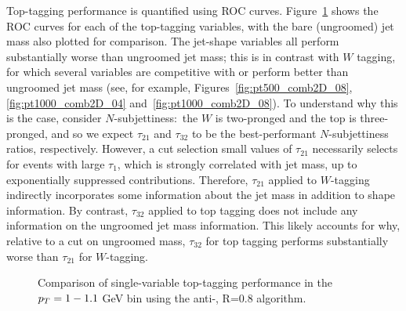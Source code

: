 Top-tagging performance is quantified using ROC curves. Figure~\ref{fig:single_variable_ROC} shows the ROC curves for each of the top-tagging variables, with the bare (ungroomed) jet mass also plotted for comparison. The jet-shape variables all perform substantially worse than ungroomed jet mass; this is in contrast with $W$ tagging, for which several variables are competitive with or perform better than ungroomed jet mass (see, for example, Figures~\ref{fig:pt500_comb2D_08}, \ref{fig:pt1000_comb2D_04} and~\ref{fig:pt1000_comb2D_08}).
To understand why this is the case, consider $N$-subjettiness:~the $W$ is two-pronged and the top is three-pronged, and so we expect $\tau_{21}$ and $\tau_{32}$ to be the best-performant $N$-subjettiness ratios, respectively. However, a cut selection small values of $\tau_{21}$ necessarily selects for events with large $\tau_1$, which is strongly correlated with jet mass, up to exponentially suppressed contributions. Therefore, $\tau_{21}$ applied to $W$-tagging indirectly incorporates some information about the jet mass in addition to shape information. By contrast, $\tau_{32}$ applied to top tagging does not include any information on the ungroomed jet mass information.  This likely accounts for why, relative to a cut on ungroomed mass, $\tau_{32}$ for top tagging performs substantially worse than $\tau_{21}$ for $W$-tagging. 


\begin{figure}
\centering
{}
\caption{Comparison of single-variable top-tagging performance in the $p_T= 1-1.1$ GeV bin using the anti-\kT, R=0.8 algorithm.}
\label{fig:single_variable_ROC}
\end{figure}

